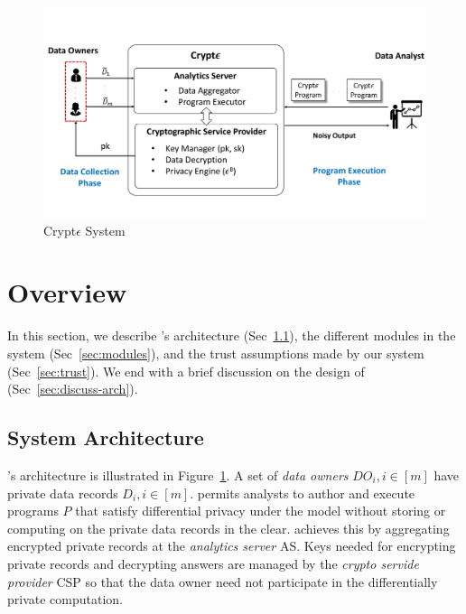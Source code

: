 \begin{figure}[t]
	\includegraphics[width=\columnwidth]{diag.pdf}
	\caption{\label{fig:system} Crypt$\epsilon$ System}%
\end{figure}


\section{\system Overview}\label{sec:overview}
In this section, we describe \system's architecture (Sec~\ref{sec:arch}), the different modules in the system (Sec~\ref{sec:modules}), and the trust assumptions made by our system (Sec~\ref{sec:trust}). We end with a brief discussion on the design of \system (Sec~\ref{sec:discuss-arch}). 

\subsection{System Architecture}\label{sec:arch}
\system's architecture is illustrated in Figure~\ref{fig:system}. A set of \textit{data owners} ${DO_i, i\in [m]}$ have private data records ${D_i, i \in [m]}$. \system permits analysts to author and execute programs $P$ that satisfy differential privacy under the \cdp model without storing or computing on the private data records in the clear. \system achieves this by aggregating encrypted private records at the \textit{analytics server} \textsf{AS}. Keys needed for encrypting private records and decrypting answers are managed by the \textit{crypto servide provider} \textsf{CSP} so that the data owner need not participate in the differentially private computation.    

